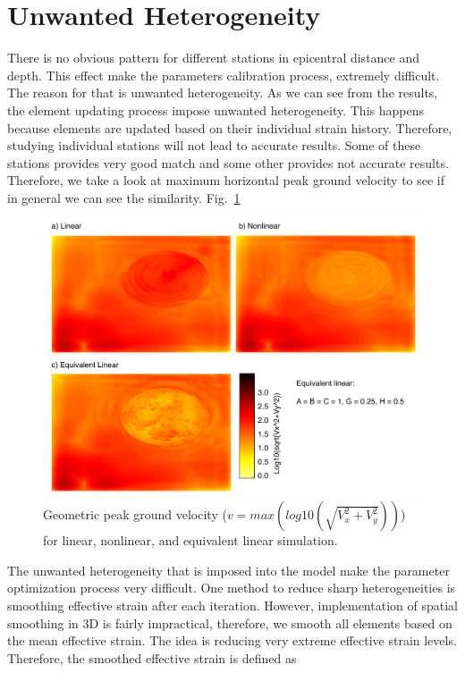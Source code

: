 \section{Unwanted Heterogeneity}

There is no obvious pattern for different stations in epicentral distance and depth. This effect make the parameters calibration process, extremely difficult. The reason for that is unwanted heterogeneity. As we can see from the results, the element updating process impose unwanted heterogeneity. This happens because elements are updated based on their individual strain history. Therefore, studying individual stations will not lead to accurate results. Some of these stations provides very good match and some other provides not accurate results. Therefore, we take a look at maximum horizontal peak ground velocity to see if in general we can see the similarity. Fig.~\ref{fig:plane_lin_nonlin_eqlin}

\begin{figure}[H]
    \centering
    \includegraphics[width=\textwidth]{figures/pdf/plane_lin_nonlin_eqlin.pdf}
    \caption{Geometric peak ground velocity ($v=max(log10(\sqrt{V_x^2+V_y^2}))$) for linear, nonlinear, and equivalent linear simulation. }
    \label{fig:plane_lin_nonlin_eqlin}
\end{figure}

The unwanted heterogeneity that is imposed into the model make the parameter optimization process very difficult. One method to reduce sharp heterogeneities is smoothing effective strain after each iteration. However, implementation of spatial smoothing in 3D is fairly impractical, therefore, we smooth all elements based on the mean effective strain. The idea is reducing very extreme effective strain levels.  Therefore, the smoothed effective strain is defined as

